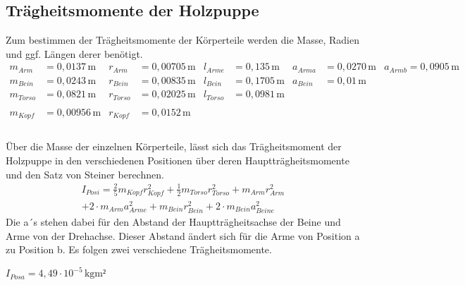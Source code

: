 \documentclass[titlepage = firstcover]{scrartcl}
\begin{document}
      \subsection{Trägheitsmomente der Holzpuppe}

      
      Zum bestimmen der Trägheitsmomente der Körperteile werden die Masse, Radien und ggf. Längen derer benötigt.
      \begin{align*}
        m_{Arm} &= 0,0137 \, \text{m} & r_{Arm} &= 0,00705 \, \text{m} & l_{Arme} &= 0,135 \, \text{m} & a_{Arma} &= 0,0270 \, \text{m} & a_{Armb} = 0,0905 \, \text{m} \\
        m_{Bein} &= 0,0243 \, \text{m} & r_{Bein} &= 0,00835 \, \text{m} & l_{Bein} &= 0,1705 \, \text{m} & a_{Bein} &= 0,01 \, \text{m} & \\
        m_{Torso} &= 0,0821 \, \text{m} &  r_{Torso} &= 0,02025 \, \text{m} & l_{Torso} &= 0,0981 \, \text{m} & \\ & \\
        m_{Kopf} &= 0,00956 \, \text{m} & r_{Kopf} &= 0,0152 \, \text{m} & \\ & \\ &
      \end{align*}

      Über die Masse der einzelnen Körperteile, lässt sich das Trägheitsmoment der Holzpuppe in den verschiedenen Positionen über deren Hauptträgheitsmomente und 
      den Satz von Steiner berechnen.
      \begin{equation}
        \begin{split}
          I_{Posi} = \frac{2}{5} m_{Kopf}r_{Kopf}^2 + \frac{1}{2} m_{Torso} r_{Torso}^2 + m_{Arm} r_{Arm}^2 \\
                    + 2 \cdot m_{Arm} a_{Arme}^2 + m_{Bein} r_{Bein}^2 + 2 \cdot m_{Bein} a_{Beine}^2
        \end{split}
      \end{equation}
      Die a´s stehen dabei für den Abstand der Hauptträgheitsachse der Beine und Arme von der Drehachse. Dieser Abstand ändert sich für die Arme von Position a 
      zu Position b. Es folgen zwei verschiedene Trägheitsmomente.\newline
      
      $I_{Posa} = 4,49 \cdot 10^{-5} \, \text{kgm²}$ \newline
      
\end{document}
